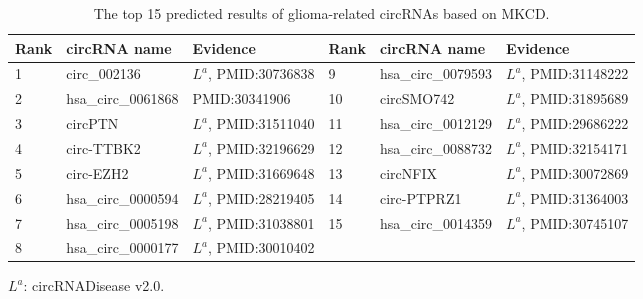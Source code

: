 \documentclass{bioinfo}
\begin{document}
\begin{methods}
\begin{table}[!t]
	\label{tab:03}
    \centering
    \begin{threeparttable}[b]  
        \caption{The top 15 predicted results of glioma-related circRNAs based on MKCD.}	\label{tab:tab3}
        \vspace{0.4cm}
        \setlength{\tabcolsep}{0pt}  %
        \begin{tabular}{p{2cm}<{\centering} p{3.9cm}<{\raggedright} p{4.5cm}<{\raggedright} | p{2cm}<{\centering} p{3.9cm}<{\raggedright} p{4.2cm}<{\raggedright}}
            \hline
            \textbf{Rank} &  \textbf{circRNA name} & \textbf{Evidence} & \textbf{Rank} &  \textbf{circRNA name} & \textbf{Evidence} \\
            \hline
            1 & circ\_002136 & $L^a$, PMID:30736838 & 9 & hsa\_circ\_0079593 & $L^a$, PMID:31148222 \\
            2 & hsa\_circ\_0061868 & PMID:30341906 & 10 & circSMO742 & $L^a$, PMID:31895689 \\
            3 & circPTN & $L^a$, PMID:31511040 & 11 & hsa\_circ\_0012129 & $L^a$, PMID:29686222 \\
            4 & circ-TTBK2 & $L^a$, PMID:32196629 & 12 & hsa\_circ\_0088732 & $L^a$, PMID:32154171 \\
            5 & circ-EZH2 & $L^a$, PMID:31669648 & 13 & circNFIX & $L^a$, PMID:30072869 \\
            6 & hsa\_circ\_0000594 &  $L^a$, PMID:28219405 & 14 & circ-PTPRZ1 & $L^a$, PMID:31364003 \\
            7 & hsa\_circ\_0005198 & $L^a$, PMID:31038801 & 15 & hsa\_circ\_0014359 & $L^a$, PMID:30745107 \\
            8 & hsa\_circ\_0000177 & $L^a$, PMID:30010402 & & & \\
            \hline
        \end{tabular}
        \begin{tablenotes}
            \item $L^a$: circRNADisease v2.0.
        \end{tablenotes}
    \end{threeparttable}
    \vspace{-0.4cm}
\end{table}


\end{methods}
\end{document}
